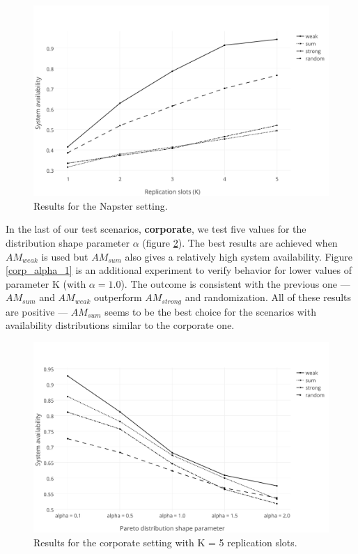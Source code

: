 \documentclass{pracamgren}
\begin{document}
\begin{figure}[h]
\centering
\includegraphics[scale=0.5]{graphs/napster.pdf}
\caption{Results for the Napster setting.}
\label{napster}
\end{figure} 
 
In the last of our test scenarios, {\bf corporate}, we test five values for the distribution shape parameter $\alpha$ (figure \ref{corp_5}). The best results are achieved when $AM_{weak}$ is used but $AM_{sum}$ also gives a relatively high system availability. Figure \ref{corp_alpha_1} is an additional experiment to verify behavior for lower values of parameter K (with $\alpha=1.0$). The outcome is consistent with the previous one --- $AM_{sum}$ and $AM_{weak}$ outperform $AM_{strong}$ and randomization. All of these results are positive --- $AM_{sum}$ seems to be the best choice for the scenarios with availability distributions similar to the corporate one.\\
 
\begin{figure}[h]
\centering
\includegraphics[scale=0.5]{graphs/corp_5.pdf}
\caption{Results for the corporate setting with K = 5 replication slots.}
\label{corp_5}
\end{figure}
\end{document}
